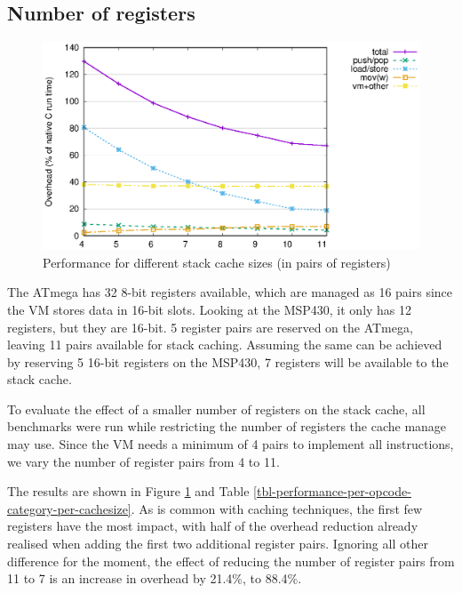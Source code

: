 \subsection{Number of registers}

\begin{figure}
\centering
\includegraphics[width=\mygraphsize]{cachesize-performance-per-opcode-category.eps}
\caption{Performance for different stack cache sizes (in pairs of registers)}
\label{fig-performance-per-opcode-category-per-cachesize}
\end{figure}



The ATmega has 32 8-bit registers available, which are managed as 16 pairs since the VM stores data in 16-bit slots. Looking at the MSP430, it only has 12 registers, but they are 16-bit. 5 register pairs are reserved on the ATmega, leaving 11 pairs available for stack caching. Assuming the same can be achieved by reserving 5 16-bit registers on the MSP430, 7 registers will be available to the stack cache.

To evaluate the effect of a smaller number of registers on the stack cache, all benchmarks were run while restricting the number of registers the cache manage may use. Since the VM needs a minimum of 4 pairs to implement all instructions, we vary the number of register pairs from 4 to 11.

The results are shown in Figure \ref{fig-performance-per-opcode-category-per-cachesize} and Table \ref{tbl-performance-per-opcode-category-per-cachesize}. As is common with caching techniques, the first few registers have the most impact, with half of the overhead reduction already realised when adding the first two additional register pairs. Ignoring all other difference for the moment, the effect of reducing the number of register pairs from 11 to 7 is an increase in overhead by 21.4\%, to 88.4\%.

